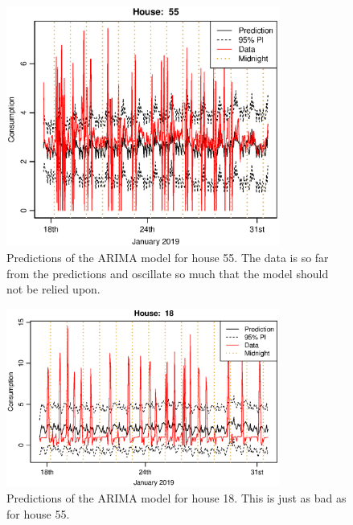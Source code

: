 \begin{figure}
    \centering
    \includegraphics[width=0.8\textwidth]{../../../figures/arimax/arima1_pred_55.eps}
    \caption{Predictions of the ARIMA model for house 55. The data is so far from the predictions and oscillate so much that the model should not be relied upon.}
    \label{fig:arima1_pred_55}
\end{figure}

\begin{figure}
    \centering
    \includegraphics[width=0.8\textwidth]{../../../figures/arimax/arima1_pred_18.eps}
    \caption{Predictions of the ARIMA model for house 18. This is just as bad as for house 55.}
    \label{fig:arima1_pred_18}
\end{figure}



